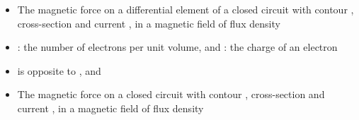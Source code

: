 \ELhold


\begin{ELunit}

\begin{itemize}
\tightlist
\item
  The magnetic force on a differential element of a closed circuit with contour , cross-section  and current , in a magnetic field of flux density 
\end{itemize}



\end{ELunit}

\begin{ELjoin}

\begin{itemize}
\tightlist
\item
  : the number of electrons per unit volume, and : the charge of an electron
\item
  \ELim{\dif\vect{\ell}} is opposite to , and 
\end{itemize}

\begin{ELimportant}{}


\end{ELimportant}

\end{ELjoin}

\begin{ELjoin}

\begin{itemize}
\tightlist
\item
  The magnetic force on a closed circuit with contour , cross-section  and current , in a magnetic field of flux density 
\end{itemize}

\begin{ELimportant}{}


\end{ELimportant}

\end{ELjoin}

